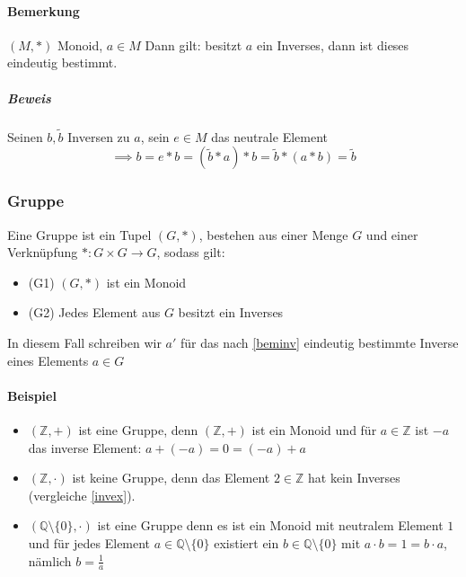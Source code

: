 \documentclass[a4paper]{scrartcl}
\theoremstyle{definition}
\theoremstyle{plain}
\theoremstyle{plain}
\theoremstyle{remark}
\theoremstyle{remark}
\theoremstyle{remark}
\theoremstyle{remark}
\theoremstyle{remark}
\begin{document}
\paragraph{Bemerkung}
\label{sec-3-1-3-2}
\label{beminv}
$(M,*)$ Monoid, $a\in M$ Dann gilt: besitzt $a$ ein Inverses, dann ist dieses eindeutig bestimmt.
\subparagraph{Beweis}
\label{sec-3-1-3-2-1}
Seinen $b,\tilde b$ Inversen zu $a$, sein $e\in M$ das neutrale Element
\[\implies b = e * b = (\tilde b * a) * b = \tilde b * (a * b) = \tilde b\]
\subsubsection{Gruppe}
\label{sec-3-1-4}
Eine Gruppe ist ein Tupel $(G,*)$, bestehen aus einer Menge $G$ und einer Verknüpfung $*:G\times G \to G$, sodass gilt:
\begin{itemize}
\item (G1) $(G,*)$ ist ein Monoid
\item (G2) Jedes Element aus $G$ besitzt ein Inverses
\end{itemize}
In diesem Fall schreiben wir $a'$ für das nach \ref{beminv} eindeutig bestimmte Inverse eines Elements $a\in G$
\paragraph{Beispiel}
\label{sec-3-1-4-1}
\begin{itemize}
\item $(\mathbb{Z},+)$ ist eine Gruppe, denn $(\mathbb{Z},+)$ ist ein Monoid und für $a\in\mathbb{Z}$ ist $-a$ das inverse Element: $a + (-a) = 0 = (-a) + a$
\item $(\mathbb{Z},\cdot)$ ist keine Gruppe, denn das Element $2\in\mathbb{Z}$ hat kein Inverses (vergleiche \ref{invex}).
\item $(\mathbb{Q}\setminus \{0\},\cdot)$ ist eine Gruppe denn es ist ein Monoid mit neutralem Element $1$ und für jedes Element $a\in\mathbb{Q}\setminus\{0\}$ existiert ein $b\in \mathbb{Q}\setminus \{0\}$ mit $a\cdot b = 1 = b\cdot a$, nämlich $b = \frac{1}{a}$
\end{itemize}
\end{document}
